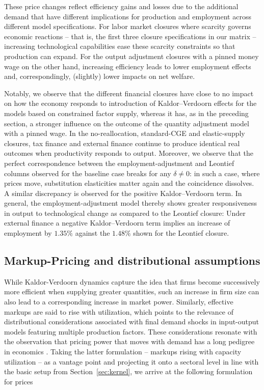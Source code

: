These price changes reflect efficiency gains and losses due to the additional demand that have different implications for production and employment across different model specifications. For labor market closures where scarcity governs economic reactions -- that is, the first three closure specifications in our matrix -- increasing technological capabilities ease these scarcity constraints so that production can expand. For the output adjustment closures with a pinned money wage on the other hand,  increasing efficiency leads to lower employment effects and, correspondingly, (slightly) lower impacts on net welfare.

Notably, we observe that the different financial closures have close to no impact on how the economy responds to introduction of Kaldor--Verdoorn effects for the models based on constrained factor supply, whereas it has, as in the preceding section, a stronger influence on the outcome of the quantity adjustment model with a pinned wage. In the no-reallocation, standard-CGE and elastic-supply closures, tax finance and external finance continue to produce identical real outcomes when productivity responds to output. Moreover, we observe that the perfect correspondence between the employment-adjustment and Leontief columns observed for the baseline case breaks for any $\delta \neq 0$: in such a case, where prices move, substitution elasticities matter again and the coincidence dissolves. A similar discrepancy is observed for the positive Kaldor--Verdoorn term. In general, the employment-adjustment model thereby shows greater responsiveness in output to technological change as compared to the Leontief closure: Under external finance a negative Kaldor--Verdoorn term implies an increase of employment by $1.35\%$ against the $1.48\%$ shown for the Leontief closure. 



\subsection{Markup-Pricing and distributional assumptions}\label{subsec:pricing-markup}

While Kaldor-Verdoorn dynamics capture the idea that firms become successively more efficient when supplying greater quantities, such an increase in firm size can also lead to a corresponding increase in market power. Similarly, effective markups are said to rise with utilization, which points to the relevance of distributional considerations associated with final demand shocks in input-output models featuring multiple production factors. These considerations resonate with the observation that pricing power that moves with demand has a long pedigree in economics \citep{Kalecki1954,Bils1987}. Taking the latter formulation -- markups rising with capacity utilization -- as a vantage point and projecting it onto a sectoral level in line with the basic setup from Section~\ref{sec:kernel}, we arrive at the following formulation for prices 

